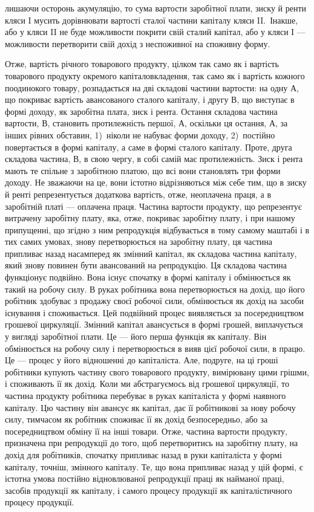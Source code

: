 \parcont{}  %
лишаючи осторонь акумуляцію, то сума вартости заробітної плати, зиску й ренти
кляси I мусить дорівнювати вартості сталої частини капіталу кляси II.~Інакше,
або у кляси II не буде можливости покрити свій сталий капітал, або у кляси І —
можливости перетворити свій дохід з неспоживної на споживну форму.

Отже, вартість річного товарового продукту, цілком так само як і вартість
товарового продукту окремого капіталовкладення, так само як і вартість кожного
поодинокого товару, розпадається на дві складові частини вартости: на одну $А$, що
покриває вартість авансованого сталого капіталу, і другу $В$, що виступає в формі
доходу, як заробітна плата, зиск і рента. Остання складова частина вартости, $В$,
становить протилежність першої, $А$, оскільки ця остання, $А$, за інших рівних
обставин, 1)~ніколи не набуває форми доходу, 2)~постійно повертається в формі
капіталу, а саме в формі сталого капіталу. Проте, друга складова частина, $В$,
в свою чергу, в собі самій має протилежність. Зиск і рента мають те спільне з заробітною
платою, що всі вони становлять три форми доходу. Не зважаючи на це,
вони істотно відрізняються між себе тим, що в зиску й ренті репрезентується
додаткова вартість, отже, неоплачена праця, а в заробітній платі — оплачена
праця. Частина вартости продукту, що репрезентує витрачену заробітну плату,
яка, отже, покриває заробітну плату, і при нашому припущенні, що згідно з ним
репродукція відбувається в тому самому маштабі і в тих самих умовах, знову
перетворюється на заробітну плату, ця частина припливає назад насамперед
як змінний капітал, як складова частина капіталу, який знову повинен бути
авансований на репродукцію. Ця складова частина функціонує подвійно. Вона
існує спочатку в формі капіталу і обмінюється як такий на робочу силу. В руках
робітника вона перетворюється на дохід, що його робітник здобуває з продажу
своєї робочої сили, обмінюється як дохід на засоби існування і споживається.
Цей подвійний процес виявляється за посередництвом грошевої циркуляції. Змінний
капітал авансується в формі грошей, виплачується у вигляді заробітної плати.
Це — його перша функція як капіталу. Він обмінюється на робочу силу і перетворюється
в вияв цієї робочої сили, в працю. Це — процес у його відношенні до
капіталіста. Але, подруге, на ці гроші робітники купують частину свого товарового
продукту, вимірювану цими грішми, і споживають її як дохід. Коли ми
абстрагуємось від грошевої циркуляції, то частина продукту робітника перебуває
в руках капіталіста у формі наявного капіталу. Цю частину він авансує як
капітал, дає її робітникові за нову робочу силу, тимчасом як робітник споживає
її як дохід безпосередньо, або за посередництвом обміну її на інші товари.
Отже, частина вартости продукту, призначена при репродукції до того, щоб перетворитись
на заробітну плату, на дохід для робітників, спочатку припливає
назад в руки капіталіста у формі капіталу, точніш, змінного капіталу. Те, що
вона припливає назад у цій формі, є істотна умова постійно відновлюваної
репродукції праці як найманої праці, засобів продукції як капіталу, і самого
процесу продукції як капіталістичного процесу продукції.

